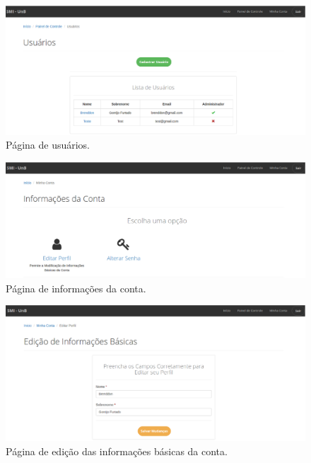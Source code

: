 \begin{anexosenv}
\begin{figure}[!htpb]
    \centering
    \includegraphics[keepaspectratio=true,scale=0.35]{figuras/img2.eps}
    \caption{Página de usuários.}
    \label{img2}
\end{figure}

\begin{figure}[!htpb]
    \centering
    \includegraphics[keepaspectratio=true,scale=0.35]{figuras/img4.eps}
    \caption{Página de informações da conta.}
    \label{img4}
\end{figure}

\begin{figure}[!htpb]
    \centering
    \includegraphics[keepaspectratio=true,scale=0.35]{figuras/img5.eps}
    \caption{Página de edição das informações básicas da conta.}
    \label{img5}
\end{figure}


\end{anexosenv}
